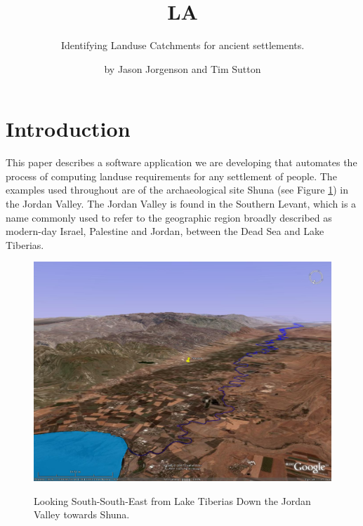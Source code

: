 

\title{LA} \subtitle{Identifying Landuse Catchments for 
ancient settlements.}

\author{by Jason Jorgenson and Tim Sutton}

\maketitle

\section{Introduction} \label{sec:Introduction}

This paper describes a software application we are developing that automates
the process of computing landuse requirements for any settlement of people.
The examples used throughout are of the archaeological site Shuna (see Figure
\ref{fig:shunaGoogleEarth}) in the Jordan Valley.
The Jordan Valley is found in the Southern Levant, which is
a name commonly used to refer to the geographic region broadly described as
modern-day Israel, Palestine and Jordan, between the Dead Sea and Lake
Tiberias.

\begin{figure}[htbp] %
\includegraphics[scale=0.17]{./images/ShunaGoogleEarth3D.jpg}
\label{fig:shunaGoogleEarth} \caption{Looking South-South-East from Lake
Tiberias Down the Jordan Valley towards Shuna.} 
\end{figure}

